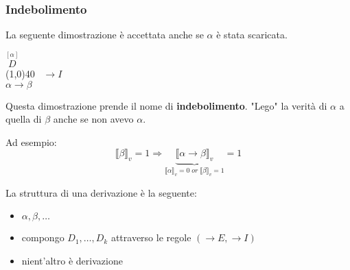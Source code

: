 \documentclass{article}
\theoremstyle{break}
\theoremstyle{break}
\theoremstyle{break}
\theoremstyle{break}
\begin{document}
\subsubsection{Indebolimento}
La seguente dimostrazione è accettata anche se \( \alpha \) è stata scaricata.
\begin{center}
  \(\stackrel{[\alpha]}{D}\)\\
  \hspace{1cm}\line(1,0){40}\(\;\;\; \to I \)\\
  \( \alpha \to \beta \) 
\end{center}
Questa dimostrazione prende il nome di \textbf{indebolimento}. "Lego" la verità di \( \alpha \) 
a quella di \( \beta \) anche se non avevo \( \alpha \).

Ad esempio:
\[
  \llbracket \beta\rrbracket_v=1 \Rightarrow \underbrace{\llbracket \alpha \to \beta\rrbracket_v}_{\llbracket \alpha\rrbracket_v=0\;or\;\llbracket \beta\rrbracket_v=1}=1
\] 

La struttura di una derivazione è la seguente:
\begin{itemize}
  \item \( \alpha,\beta, \ldots \) 
  \item compongo \( D_1, \ldots, D_k \) attraverso le regole \( (\to E, \to I) \) 
  \item nient'altro è derivazione
\end{itemize}
\end{document}
